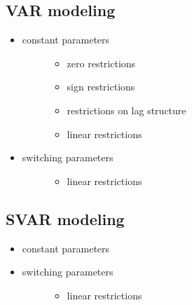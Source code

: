 \documentclass[letterpaper,10pt,english]{sphinxmanual}
\begin{document}
\subsection{VAR modeling}
\label{intro_folder/rise_capabilities:var-modeling}\begin{itemize}
\item {} \begin{description}
\item[{constant parameters}] \leavevmode\begin{itemize}
\item {} 
zero restrictions

\item {} 
sign restrictions

\item {} 
restrictions on lag structure

\item {} 
linear restrictions

\end{itemize}

\end{description}

\item {} \begin{description}
\item[{switching parameters}] \leavevmode\begin{itemize}
\item {} 
linear restrictions

\end{itemize}

\end{description}

\end{itemize}


\subsection{SVAR modeling}
\label{intro_folder/rise_capabilities:svar-modeling}\begin{itemize}
\item {} 
constant parameters

\item {} \begin{description}
\item[{switching parameters}] \leavevmode\begin{itemize}
\item {} 
linear restrictions

\end{itemize}

\end{description}

\end{itemize}
\end{document}
